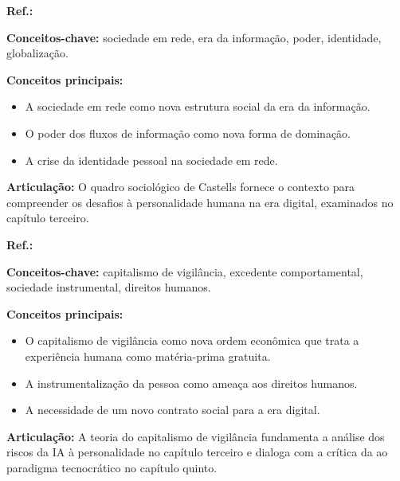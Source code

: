 \begin{fichamento}
    \textbf{Ref.:} \cite{Castells2010EI}
    
    \textbf{Conceitos-chave:} sociedade em rede, era da informação, poder, identidade, globalização.
    
    \textbf{Conceitos principais:}
    \begin{itemize}
        \item A sociedade em rede como nova estrutura social da era da informação.
        \item O poder dos fluxos de informação como nova forma de dominação.
        \item A crise da identidade pessoal na sociedade em rede.
    \end{itemize}
    
    \textbf{Articulação:} O quadro sociológico de Castells fornece o contexto para compreender os desafios à personalidade humana na era digital, examinados no capítulo terceiro.
\end{fichamento}

\begin{fichamento}
    \textbf{Ref.:} \cite{Zuboff2019SC}
    
    \textbf{Conceitos-chave:} capitalismo de vigilância, excedente comportamental, sociedade instrumental, direitos humanos.
    
    \textbf{Conceitos principais:}
    \begin{itemize}
        \item O capitalismo de vigilância como nova ordem econômica que trata a experiência humana como matéria-prima gratuita.
        \item A instrumentalização da pessoa como ameaça aos direitos humanos.
        \item A necessidade de um novo contrato social para a era digital.
    \end{itemize}
    
    \textbf{Articulação:} A teoria do capitalismo de vigilância fundamenta a análise dos riscos da IA à personalidade no capítulo terceiro e dialoga com a crítica da \MH{} ao paradigma tecnocrático no capítulo quinto.
\end{fichamento}

